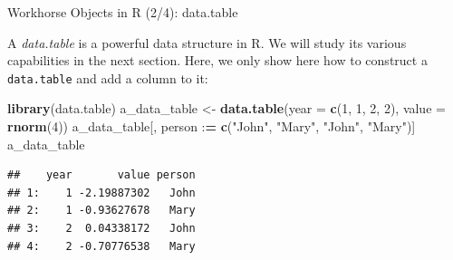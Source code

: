 \documentclass[10pt,ignorenonframetext,]{beamer}
\newenvironment{Shaded}{\begin{snugshade}}{\end{snugshade}}
\newcommand{\KeywordTok}[1]{\textcolor[rgb]{0.13,0.29,0.53}{\textbf{{#1}}}}
\newcommand{\DataTypeTok}[1]{\textcolor[rgb]{0.13,0.29,0.53}{{#1}}}
\newcommand{\DecValTok}[1]{\textcolor[rgb]{0.00,0.00,0.81}{{#1}}}
\newcommand{\StringTok}[1]{\textcolor[rgb]{0.31,0.60,0.02}{{#1}}}
\newcommand{\ErrorTok}[1]{\textcolor[rgb]{0.64,0.00,0.00}{\textbf{{#1}}}}
\newcommand{\NormalTok}[1]{{#1}}
\begin{document}
\begin{frame}[fragile]{Workhorse Objects in R (2/4): data.table}

A \emph{data.table} is a powerful data structure in R. We will study its
various capabilities in the next section. Here, we only show here how to
construct a \texttt{data.table} and add a column to it:

\footnotesize

\begin{Shaded}
\begin{Highlighting}[]
\KeywordTok{library}\NormalTok{(data.table)}
\NormalTok{a_data_table <-}\StringTok{ }\KeywordTok{data.table}\NormalTok{(}\DataTypeTok{year =} \KeywordTok{c}\NormalTok{(}\DecValTok{1}\NormalTok{, }\DecValTok{1}\NormalTok{, }\DecValTok{2}\NormalTok{, }\DecValTok{2}\NormalTok{), }\DataTypeTok{value =} \KeywordTok{rnorm}\NormalTok{(}\DecValTok{4}\NormalTok{))}
\NormalTok{a_data_table[, person :}\ErrorTok{=}\StringTok{ }\KeywordTok{c}\NormalTok{(}\StringTok{"John"}\NormalTok{, }\StringTok{"Mary"}\NormalTok{, }\StringTok{"John"}\NormalTok{, }\StringTok{"Mary"}\NormalTok{)]}
\NormalTok{a_data_table}
\end{Highlighting}
\end{Shaded}

\begin{verbatim}
##    year       value person
## 1:    1 -2.19887302   John
## 2:    1 -0.93627678   Mary
## 3:    2  0.04338172   John
## 4:    2 -0.70776538   Mary
\end{verbatim}

\normalsize

\end{frame}
\end{document}
